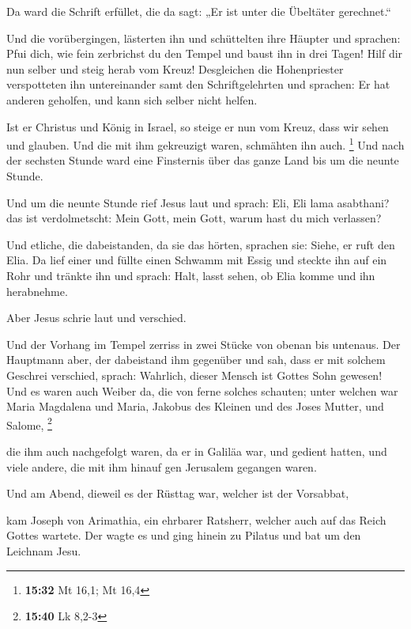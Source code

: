  Da ward die Schrift erfüllet, die da sagt: „Er ist unter
die Übeltäter gerechnet.``

 Und die vorübergingen, lästerten ihn und schüttelten
ihre Häupter und sprachen: Pfui dich, wie fein zerbrichst du den Tempel
und baust ihn in drei Tagen!  Hilf dir nun selber und
steig herab vom Kreuz!  Desgleichen die Hohenpriester
verspotteten ihn untereinander samt den Schriftgelehrten und sprachen:
Er hat anderen geholfen, und kann sich selber nicht helfen.

 Ist er Christus und König in Israel, so steige er nun
vom Kreuz, dass wir sehen und glauben. Und die mit ihm gekreuzigt waren,
schmähten ihn auch. \footnote{\textbf{15:32} Mt 16,1; Mt 16,4}
 Und nach der sechsten Stunde ward eine Finsternis über
das ganze Land bis um die neunte Stunde.

 Und um die neunte Stunde rief Jesus laut und sprach:
Eli, Eli lama asabthani? das ist verdolmetscht: Mein Gott, mein Gott,
warum hast du mich verlassen?

 Und etliche, die dabeistanden, da sie das hörten,
sprachen sie: Siehe, er ruft den Elia.  Da lief einer und
füllte einen Schwamm mit Essig und steckte ihn auf ein Rohr und tränkte
ihn und sprach: Halt, lasst sehen, ob Elia komme und ihn herabnehme.

 Aber Jesus schrie laut und verschied.

 Und der Vorhang im Tempel zerriss in zwei Stücke von
obenan bis untenaus.  Der Hauptmann aber, der dabeistand
ihm gegenüber und sah, dass er mit solchem Geschrei verschied, sprach:
Wahrlich, dieser Mensch ist Gottes Sohn gewesen!  Und es
waren auch Weiber da, die von ferne solches schauten; unter welchen war
Maria Magdalena und Maria, Jakobus des Kleinen und des Joses Mutter, und
Salome, \footnote{\textbf{15:40} Lk 8,2-3}

 die ihm auch nachgefolgt waren, da er in Galiläa war,
und gedient hatten, und viele andere, die mit ihm hinauf gen Jerusalem
gegangen waren.

 Und am Abend, dieweil es der Rüsttag war, welcher ist
der Vorsabbat,

 kam Joseph von Arimathia, ein ehrbarer Ratsherr, welcher
auch auf das Reich Gottes wartete. Der wagte es und ging hinein zu
Pilatus und bat um den Leichnam Jesu.

